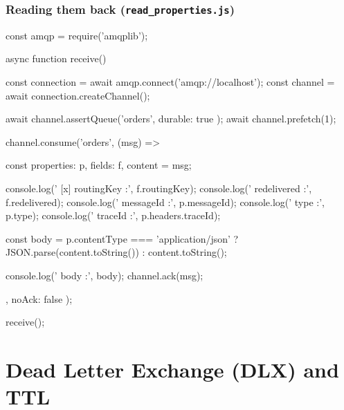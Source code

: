 \documentclass[11pt,a4paper]{article}
\begin{document}
\subsubsection*{Reading them back (\texttt{read\_properties.js})}
\begin{js}[basicstyle=\ttfamily\scriptsize]
const amqp = require('amqplib');

async function receive() {
    const connection = await amqp.connect('amqp://localhost');
    const channel = await connection.createChannel();

    await channel.assertQueue('orders', { durable: true });
    await channel.prefetch(1);

    channel.consume('orders', (msg) => {
        const { properties: p, fields: f, content } = msg;

        console.log(' [x] routingKey  :', f.routingKey);
        console.log('     redelivered :', f.redelivered);
        console.log('     messageId   :', p.messageId);
        console.log('     type        :', p.type);
        console.log('     traceId     :', p.headers.traceId);

        const body = p.contentType === 'application/json'
            ? JSON.parse(content.toString())
            : content.toString();

        console.log('     body        :', body);
        channel.ack(msg);
    }, { noAck: false });
}
receive();
\end{js}

\newpage
\section{Dead Letter Exchange (DLX) and TTL}



\end{document}
